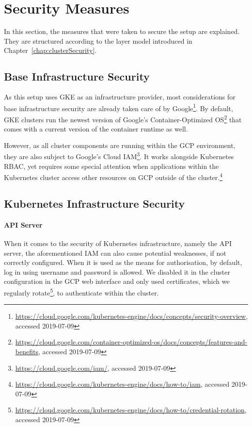 \section{Security Measures}

In this section, the measures that were taken to secure the setup are explained. They are structured according to the layer model introduced in Chapter~\ref{chap:clusterSecurity}.

\subsection{Base Infrastructure Security}

As this setup uses \ac{GKE} as an infrastructure provider, most considerations for base infrastructure security are already taken care of by Google\footnote{\url{https://cloud.google.com/kubernetes-engine/docs/concepts/security-overview}, accessed 2019-07-09}. By default, \ac{GKE} clusters run the newest version of Google's Container-Optimized OS\footnote{\url{https://cloud.google.com/container-optimized-os/docs/concepts/features-and-benefits}, accessed 2019-07-09} that comes with a current version of the container runtime as well. 

However, as all cluster components are running within the \ac{GCP} environment, they are also subject to Google's Cloud \ac{IAM}\footnote{\url{https://cloud.google.com/iam/}, accessed 2019-07-09}. It works alongside Kubernetes \ac{RBAC}, yet requires some special attention when applications within the Kubernetes cluster access other resources on \ac{GCP} outside of the cluster.\footnote{\url{https://cloud.google.com/kubernetes-engine/docs/how-to/iam}, accessed 2019-07-09}

\subsection{Kubernetes Infrastructure Security}

\paragraph{API Server}

When it comes to the security of Kubernetes infrastructure, namely the API server, the aforementioned \ac{IAM} can also cause potential weaknesses, if not correctly configured. When it is used as the means for authorisation, by default, log in using username and password is allowed. We disabled it in the cluster configuration in the \ac{GCP} web interface and only used certificates, which we regularly rotate\footnote{\url{https://cloud.google.com/kubernetes-engine/docs/how-to/credential-rotation}, accessed 2019-07-09}, to authenticate within the cluster.

